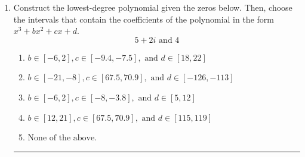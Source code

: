 \documentclass[14pt]{extbook}
\newcommand{\litem}[1]{\item#1\hspace*{-1cm}\rule{\textwidth}{0.4pt}}
\begin{document}
\begin{enumerate}
{\begin{enumerate}[label=\Alph*.]
\end{enumerate} }
\litem{
Construct the lowest-degree polynomial given the zeros below. Then, choose the intervals that contain the coefficients of the polynomial in the form $x^3+bx^2+cx+d$.\[ 5 + 2 i \text{ and } 4 \]\begin{enumerate}[label=\Alph*.]
\item \( b \in [-6, 2], c \in [-9.4, -7.5], \text{ and } d \in [18, 22] \)
\item \( b \in [-21, -8], c \in [67.5, 70.9], \text{ and } d \in [-126, -113] \)
\item \( b \in [-6, 2], c \in [-8, -3.8], \text{ and } d \in [5, 12] \)
\item \( b \in [12, 21], c \in [67.5, 70.9], \text{ and } d \in [115, 119] \)
\item \( \text{None of the above.} \)


\end{enumerate}}
\end{enumerate}
\end{document}
